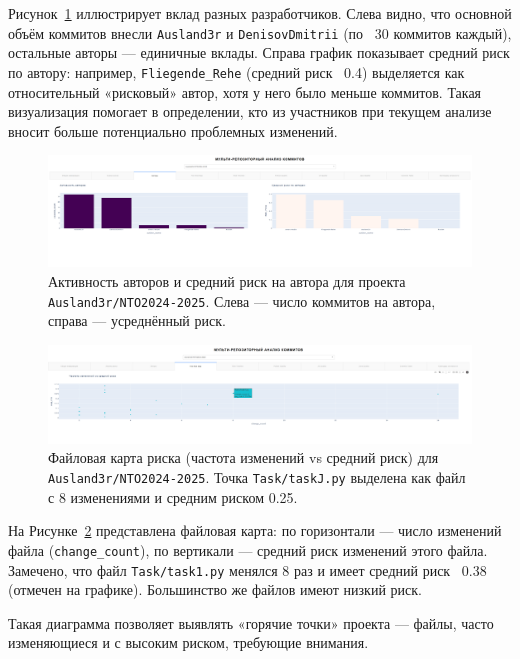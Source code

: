 \begin{itemize}
Рисунок~\ref{fig:authors} иллюстрирует вклад разных разработчиков. Слева видно, что основной объём коммитов внесли \texttt{Ausland3r} и \texttt{DenisovDmitrii} (по ~30 коммитов каждый), остальные авторы — единичные вклады. Справа график показывает средний риск по автору: например, \texttt{Fliegende\_Rehe} (средний риск ~0.4) выделяется как относительный «рисковый» автор, хотя у него было меньше коммитов. Такая визуализация помогает в определении, кто из участников при текущем анализе вносит больше потенциально проблемных изменений.

 \begin{figure}[ht]
	\centering
	\includegraphics[width=\textwidth]{my_folder/images/third_page.png}
	\caption{Активность авторов и средний риск на автора для проекта \texttt{Ausland3r/NTO2024-2025}. Слева — число коммитов на автора, справа — усреднённый риск.}
	\label{fig:authors}
\end{figure}
 \begin{figure}[ht]
	\centering
	\includegraphics[width=\textwidth]{my_folder/images/forth_page.png}
	\caption{Файловая карта риска (частота изменений vs средний риск) для \texttt{Ausland3r/NTO2024-2025}. Точка \texttt{Task/taskJ.py} выделена как файл с 8 изменениями и средним риском 0.25.}
	\label{fig:file_risk}
\end{figure}

На Рисунке~\ref{fig:file_risk} представлена файловая карта: по горизонтали — число изменений файла (\texttt{change\_count}), по вертикали — средний риск изменений этого файла. Замечено, что файл \texttt{Task/task1.py} менялся 8 раз и имеет средний риск ~0.38 (отмечен на графике). Большинство же файлов имеют низкий риск. 

Такая диаграмма позволяет выявлять «горячие точки» проекта — файлы, часто изменяющиеся и с высоким риском, требующие внимания. 



\end{itemize}
